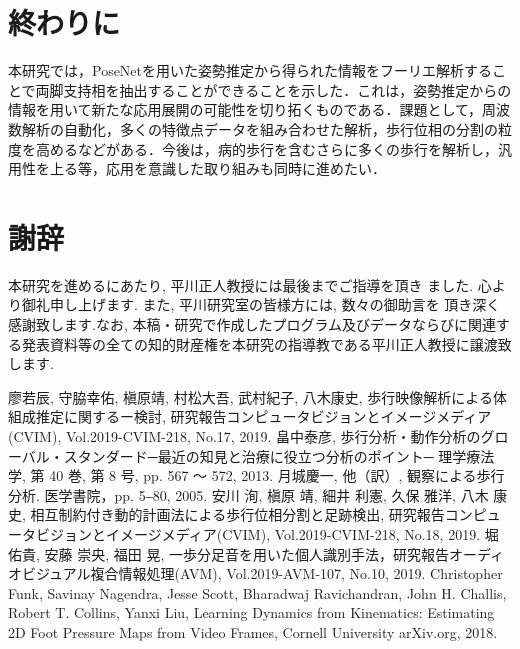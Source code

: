 \documentclass[a4j,10.5pt]{jreport}
\renewcommand{\bibname}{参考文献}
\begin{document}
\chapter{終わりに}
本研究では，PoseNetを用いた姿勢推定から得られた情報をフーリエ解析することで両脚支持相を抽出することができることを示した．これは，姿勢推定からの情報を用いて新たな応用展開の可能性を切り拓くものである．課題として，周波数解析の自動化，多くの特徴点データを組み合わせた解析，歩行位相の分割の粒度を高めるなどがある．今後は，病的歩行を含むさらに多くの歩行を解析し，汎用性を上る等，応用を意識した取り組みも同時に進めたい．

\chapter*{謝辞}
本研究を進めるにあたり, 平川正人教授には最後までご指導を頂き
ました. 心より御礼申し上げます. また, 平川研究室の皆様方には, 数々の御助言を
頂き深く感謝致します.なお, 本稿・研究で作成したプログラム及びデータならびに関連する発表資料等の全ての知的財産権を本研究の指導教である平川正人教授に譲渡致します.


% 
\begin{thebibliography}{99}

   廖若辰, 守脇幸佑, 槇原靖, 村松大吾, 武村紀子, 八木康史, 歩行映像解析による体組成推定に関するー検討, 研究報告コンピュータビジョンとイメージメディア(CVIM), Vol.2019-CVIM-218, No.17, 2019.
   畠中泰彦, 歩行分析・動作分析のグローバル・スタンダード─最近の知見と治療に役立つ分析のポイント─ 理学療法学, 第 40 巻, 第 8 号, pp. 567 ～ 572, 2013.
   月城慶一, 他（訳）, 観察による歩行分析. 医学書院，pp. 5‒80, 2005.
 安川 洵, 槇原 靖, 細井 利憲, 久保 雅洋, 八木 康史, 相互制約付き動的計画法による歩行位相分割と足跡検出, 研究報告コンピュータビジョンとイメージメディア(CVIM), Vol.2019-CVIM-218, No.18, 2019.
 堀 佑貴, 安藤 崇央, 福田 晃, 一歩分足音を用いた個人識別手法，研究報告オーディオビジュアル複合情報処理(AVM), Vol.2019-AVM-107, No.10, 2019.
 Christopher Funk, Savinay Nagendra, Jesse Scott, Bharadwaj Ravichandran, John H. Challis, Robert T. Collins, Yanxi Liu, Learning Dynamics from Kinematics: Estimating 2D Foot Pressure Maps from Video Frames, Cornell University arXiv.org, 2018.

\end{thebibliography}
\addcontentsline{toc}{chapter}{\bibname}
\end{document}
